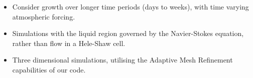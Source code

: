\documentclass[landscape,24pt, a0paper,colspace=10mm,blockverticalspace=12mm]{tikzposter}
\begin{document}
\begin{columns}
\begin{subcolumns}
{}
 

 
{
\begin{itemize}
\item Consider growth over longer time periods (days to weeks), with time varying atmospheric forcing.
\item Simulations with the liquid region governed by the Navier-Stokes equation, rather than flow in a Hele-Shaw cell.
\item Three dimensional simulations, utilising the Adaptive Mesh Refinement capabilities of our code.
\end{itemize}
}

 
\end{subcolumns}

\end{columns}
\end{document}
